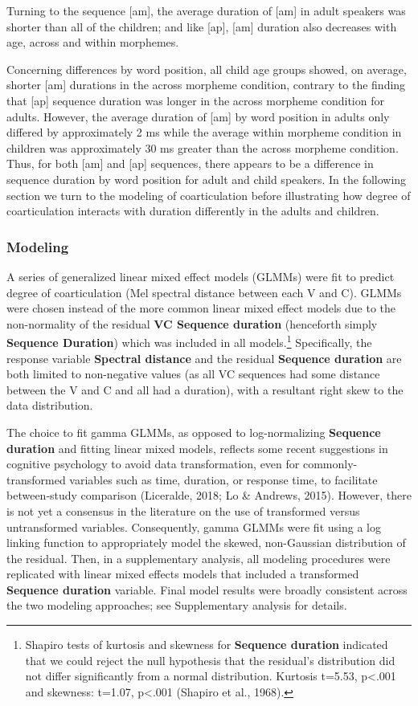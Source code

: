\documentclass[
]{article}
\begin{document}
Turning to the sequence {[}am{]}, the average duration of {[}am{]} in adult speakers was shorter than all of the children; and like {[}ap{]}, {[}am{]} duration also decreases with age, across and within morphemes.

Concerning differences by word position, all child age groups showed, on average, shorter {[}am{]} durations in the across morpheme condition, contrary to the finding that {[}ap{]} sequence duration was longer in the across morpheme condition for adults. However, the average duration of {[}am{]} by word position in adults only differed by approximately 2 ms while the average within morpheme condition in children was approximately 30 ms greater than the across morpheme condition. Thus, for both {[}am{]} and {[}ap{]} sequences, there appears to be a difference in sequence duration by word position for adult and child speakers. In the following section we turn to the modeling of coarticulation before illustrating how degree of coarticulation interacts with duration differently in the adults and children.

\hypertarget{modeling}{%
\subsubsection{Modeling}\label{modeling}}

A series of generalized linear mixed effect models (GLMMs) were fit to predict degree of coarticulation (Mel spectral distance between each V and C). GLMMs were chosen instead of the more common linear mixed effect models due to the non-normality of the residual \textbf{VC Sequence duration} (henceforth simply \textbf{Sequence Duration}) which was included in all models.\footnote{Shapiro tests of kurtosis and skewness for \textbf{Sequence duration} indicated that we could reject the null hypothesis that the residual's distribution did not differ significantly from a normal distribution. Kurtosis t=5.53, p\textless.001 and skewness: t=1.07, p\textless.001 (Shapiro et al., 1968).} Specifically, the response variable \textbf{Spectral distance} and the residual \textbf{Sequence duration} are both limited to non-negative values (as all VC sequences had some distance between the V and C and all had a duration), with a resultant right skew to the data distribution.

The choice to fit gamma GLMMs, as opposed to log-normalizing \textbf{Sequence duration} and fitting linear mixed models, reflects some recent suggestions in cognitive psychology to avoid data transformation, even for commonly-transformed variables such as time, duration, or response time, to facilitate between-study comparison (Liceralde, 2018; Lo \& Andrews, 2015). However, there is not yet a consensus in the literature on the use of transformed versus untransformed variables. Consequently, gamma GLMMs were fit using a log linking function to appropriately model the skewed, non-Gaussian distribution of the residual. Then, in a supplementary analysis, all modeling procedures were replicated with linear mixed effects models that included a transformed \textbf{Sequence duration} variable. Final model results were broadly consistent across the two modeling approaches; see Supplementary analysis for details.
\end{document}
